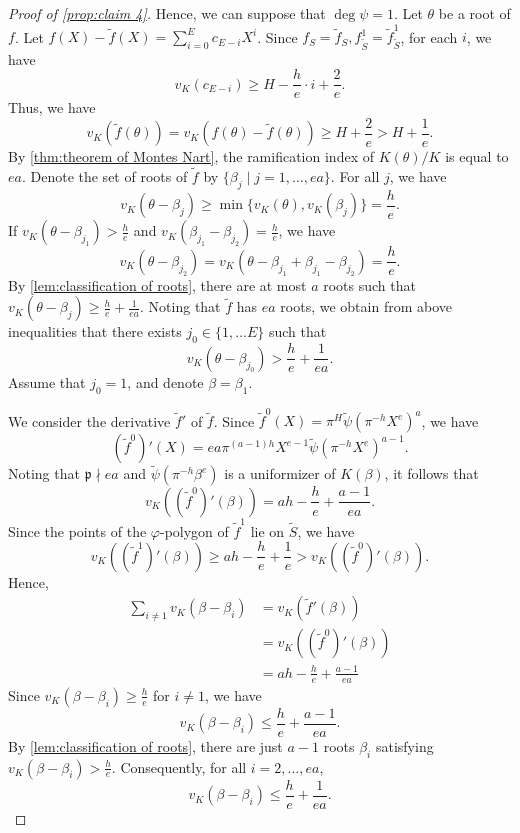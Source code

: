 \documentclass{article}
\theoremstyle{definition}
\theoremstyle{remark}
\numberwithin{equation}{section}
\begin{document}
\begin{proof}[Proof of \cref{prop:claim 4}]
    Hence, we can suppose that $\deg \psi = 1$. Let $\theta$ be a root of $f$. 
    Let $f(X) - \tilde{f}(X) = \sum_{i = 0}^E c_{E - i}X^i$. 
    Since $f_S = \tilde{f}_S, f_{\tilde{S}}^1 = \tilde{f}_{\tilde{S}}^1$, 
    for each $i$, we have 
    \[
      v_K(c_{E - i}) \ge H - \frac{h}{e} \cdot i + \frac{2}{e}. 
    \]
    Thus, we have 
    \[
      v_K(\tilde{f}(\theta)) = v_K(f(\theta) - \tilde{f}(\theta)) \ge H + \frac{2}{e} > H + \frac{1}{e}. 
    \]
    By \cref{thm:theorem of Montes Nart}, the ramification index of $K(\theta)/K$ is equal to $ea$. 
    Denote the set of roots of $\tilde{f}$ by $\{\beta_j \mid j = 1, \dots ,ea\}$. 
    For all $j$, we have 
    \[
      v_K(\theta - \beta_j) \ge \min\{v_K(\theta),v_K(\beta_j)\} = \frac{h}{e}. 
    \]
    If $v_K(\theta - \beta_{j_1}) > \frac{h}{e}$ and $v_K(\beta_{j_1} - \beta_{j_2}) = \frac{h}{e}$, we have 
    \[
      v_K(\theta - \beta_{j_2}) = v_K(\theta - \beta_{j_1} + \beta_{j_1} - \beta_{j_2}) = \frac{h}{e}. 
    \]
    By \cref{lem:classification of roots}, there are at most $a$ roots such that $v_K(\theta - \beta_j) \ge \frac{h}{e} + \frac{1}{ea}$. 
    Noting that $\tilde{f}$ has $ea$ roots, we obtain from above inequalities that there exists $j_0 \in \{1, \dots E\}$ such that 
    \[
      v_K(\theta - \beta_{j_0}) > \frac{h}{e} + \frac{1}{ea} \label{formula:prop4-2}. 
    \]
    Assume that $j_0 = 1$, and denote $\beta = \beta_1$. 

    We consider the derivative $\tilde{f}'$ of $\tilde{f}$. 
    Since $\tilde{f}^0(X) = \pi^H\tilde{\psi}(\pi^{-h}X^e)^a$, we have 
    \[
      (\tilde{f}^0)'(X) = ea\pi^{(a-1)h}X^{e - 1}\tilde{\psi}(\pi^{-h}X^e)^{a - 1}. 
    \]
    Noting that $\mathfrak{p} \nmid ea$ and $\tilde{\psi}(\pi^{-h}\beta^e)$ is a uniformizer of $K(\beta)$, it follows that 
    \[
      v_K((\tilde{f}^0)'(\beta)) = ah - \frac{h}{e} +\frac{a - 1}{ea}. 
    \]
    Since the points of  the $\varphi$-polygon of $\tilde{f}^1$ lie on $\tilde{S}$, we have 
    \[
      v_K((\tilde{f}^1)'(\beta)) \ge ah - \frac{h}{e} + \frac{1}{e} > v_K((\tilde{f}^0)'(\beta)). 
    \]
    Hence, 
    \begin{align}
      \sum_{i \ne 1} v_K(\beta - \beta_i) &= v_K(\tilde{f}'(\beta)) \\ 
      &=v_K((\tilde{f}^0)'(\beta)) \\
      &= ah - \frac{h}{e} + \frac{a - 1}{ea}
    \end{align}
    Since $v_K(\beta - \beta_i) \ge \frac{h}{e}$ for $i \ne 1$, we have 
    \[
      v_K(\beta - \beta_i) \le \frac{h}{e} + \frac{a - 1}{ea}. 
    \]
    By \cref{lem:classification of roots}, there are just $a - 1$ roots $\beta_i$ satisfying $v_K(\beta - \beta_i) > \frac{h}{e}$. 
    Consequently, for all $i = 2, \dots ,ea$, 
    \[
      v_K(\beta - \beta_i) \le \frac{h}{e} + \frac{1}{ea}. \label{formula:prop4-3}
    \]


\end{proof}
\end{document}
